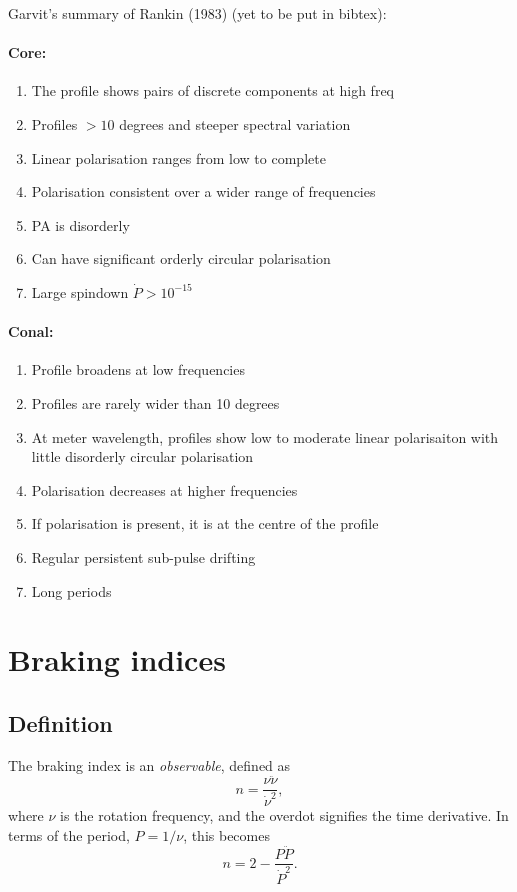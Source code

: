 \documentclass{book}
\begin{document}
Garvit's summary of Rankin (1983) (yet to be put in bibtex):

\paragraph{Core:}
\begin{enumerate}
    \item The profile shows pairs of discrete components at high freq
    \item Profiles $>10$ degrees and steeper spectral variation
    \item Linear polarisation ranges from low to complete
    \item Polarisation consistent over a wider range of frequencies
    \item PA is disorderly
    \item Can have significant orderly circular polarisation
    \item Large spindown $\dot{P} > 10^{-15}$
\end{enumerate}

\paragraph{Conal:}
\begin{enumerate}
\item Profile broadens at low frequencies
\item Profiles are rarely wider than 10 degrees
\item At meter wavelength, profiles show low to moderate linear polarisaiton with little disorderly circular polarisation
\item Polarisation decreases at higher frequencies
\item If polarisation is present, it is at the centre of the profile
\item Regular persistent sub-pulse drifting
\item Long periods
\end{enumerate}


\section{Braking indices}

\subsection{Definition}

The braking index is an \emph{observable}, defined as
\begin{equation}
  n = \frac{\nu\ddot{\nu}}{\dot{\nu}^2},
\end{equation}
where $\nu$ is the rotation frequency, and the overdot signifies the time derivative.
In terms of the period, $P = 1/\nu$, this becomes
\begin{equation}
    n = 2 - \frac{P\ddot{P}}{\dot{P}^2}.
\end{equation}
\end{document}
